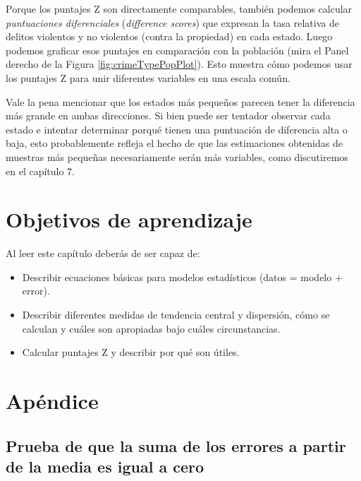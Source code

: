 \documentclass[
  12pt,
]{book}
\providecommand{\tightlist}{%
  \setlength{\itemsep}{0pt}\setlength{\parskip}{0pt}}
\begin{document}
Porque los puntajes Z son directamente comparables, también podemos calcular \emph{puntuaciones diferenciales} (\emph{difference scores}) que expresan la tasa relativa de delitos violentos y no violentos (contra la propiedad) en cada estado. Luego podemos graficar esos puntajes en comparación con la población (mira el Panel derecho de la Figura \ref{fig:crimeTypePopPlot}). Esto muestra cómo podemos usar los puntajes Z para unir diferentes variables en una escala común.

Vale la pena mencionar que los estados más pequeños parecen tener la diferencia más grande en ambas direcciones. Si bien puede ser tentador observar cada estado e intentar determinar porqué tienen una puntuación de diferencia alta o baja, esto probablemente refleja el hecho de que las estimaciones obtenidas de muestras más pequeñas necesariamente serán más variables, como discutiremos en el capítulo 7.

\hypertarget{objetivos-de-aprendizaje-4}{%
\section{Objetivos de aprendizaje}\label{objetivos-de-aprendizaje-4}}

Al leer este capítulo deberás de ser capaz de:

\begin{itemize}
\tightlist
\item
  Describir ecuaciones básicas para modelos estadísticos (datos = modelo + error).
\item
  Describir diferentes medidas de tendencia central y dispersión, cómo se calculan y cuáles son apropiadas bajo cuáles circunstancias.
\item
  Calcular puntajes Z y describir por qué son útiles.
\end{itemize}

\hypertarget{apuxe9ndice-1}{%
\section{Apéndice}\label{apuxe9ndice-1}}

\hypertarget{prueba-de-que-la-suma-de-los-errores-a-partir-de-la-media-es-igual-a-cero}{%
\subsection{Prueba de que la suma de los errores a partir de la media es igual a cero}\label{prueba-de-que-la-suma-de-los-errores-a-partir-de-la-media-es-igual-a-cero}}
\end{document}
